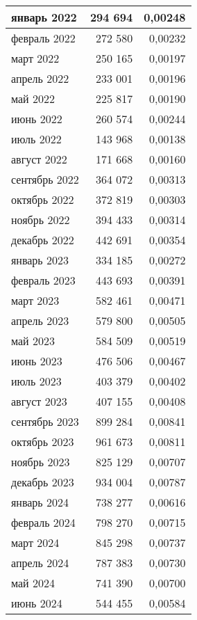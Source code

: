 \begin{longtable}[h!]{|l|r|r|}
январь 2022 & 294 694 & 0,00248 \\ \hline
февраль 2022 & 272 580 & 0,00232 \\ \hline
март 2022 & 250 165 & 0,00197 \\ \hline
апрель 2022 & 233 001 & 0,00196 \\ \hline
май 2022 & 225 817 & 0,00190 \\ \hline
июнь 2022 & 260 574 & 0,00244 \\ \hline
июль 2022 & 143 968 & 0,00138 \\ \hline
август 2022 & 171 668 & 0,00160 \\ \hline
сентябрь 2022 & 364 072 & 0,00313 \\ \hline
октябрь 2022 & 372 819 & 0,00303 \\ \hline
ноябрь 2022 & 394 433 & 0,00314 \\ \hline
декабрь 2022 & 442 691 & 0,00354 \\ \hline
январь 2023 & 334 185 & 0,00272 \\ \hline
февраль 2023 & 443 693 & 0,00391 \\ \hline
март 2023 & 582 461 & 0,00471 \\ \hline
апрель 2023 & 579 800 & 0,00505 \\ \hline
май 2023 & 584 509 & 0,00519 \\ \hline
июнь 2023 & 476 506 & 0,00467 \\ \hline
июль 2023 & 403 379 & 0,00402 \\ \hline
август 2023 & 407 155 & 0,00408 \\ \hline
сентябрь 2023 & 899 284 & 0,00841 \\ \hline
октябрь 2023 & 961 673 & 0,00811 \\ \hline
ноябрь 2023 & 825 129 & 0,00707 \\ \hline
декабрь 2023 & 934 004 & 0,00787 \\ \hline
январь 2024 & 738 277 & 0,00616 \\ \hline
февраль 2024 & 798 270 & 0,00715 \\ \hline
март 2024 & 845 298 & 0,00737 \\ \hline
апрель 2024 & 787 383 & 0,00730 \\ \hline
май 2024 & 741 390 & 0,00700 \\ \hline
июнь 2024 & 544 455 & 0,00584 \\ \hline
\end{longtable}
\endgroup

\pagebreak

